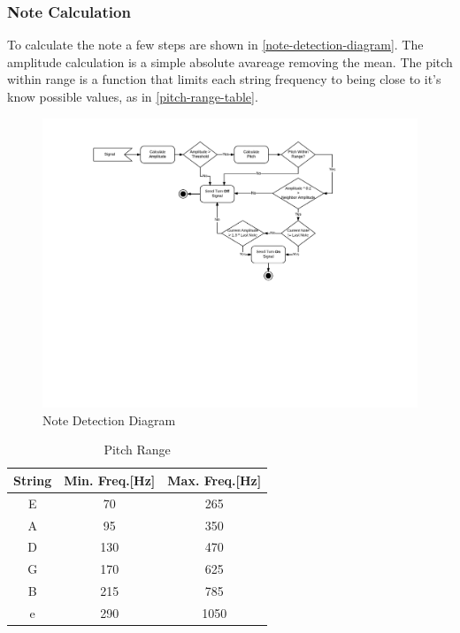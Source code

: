 \subsubsection{Note Calculation}
To calculate the note a few steps are shown in \autoref{note-detection-diagram}.
The amplitude calculation is a simple absolute avareage removing the mean. The
pitch within range is a function that limits each string frequency to
being close to it's know possible values, as in \autoref{pitch-range-table}.
\begin{figure}[htb]
	\caption{Note Detection Diagram}
	\label{note-detection-diagram}
	\begin{center}
		\includegraphics[width=0.7\paperwidth]{images/note-detection-flow-diagram.pdf}
	\end{center}
\end{figure}

\begin{table}[htb]
  \ABNTEXreducedfont
  \caption[Pitch Range]{Pitch Range}
  \label{pitch-range-table}
  \centering
  \begin{tabular}{c|c|c}
    \textbf{String} & \textbf{Min. Freq.[Hz]} & \textbf{Max. Freq.[Hz]} \\
		\hline \hline
		E & 70 & 265 \\
		\hline
		A & 95 & 350 \\
		\hline
		D & 130 & 470 \\
		\hline
		G & 170 & 625 \\
		\hline
		B & 215 & 785 \\
		\hline
		e & 290 & 1050 \\
  \end{tabular}
\end{table}


